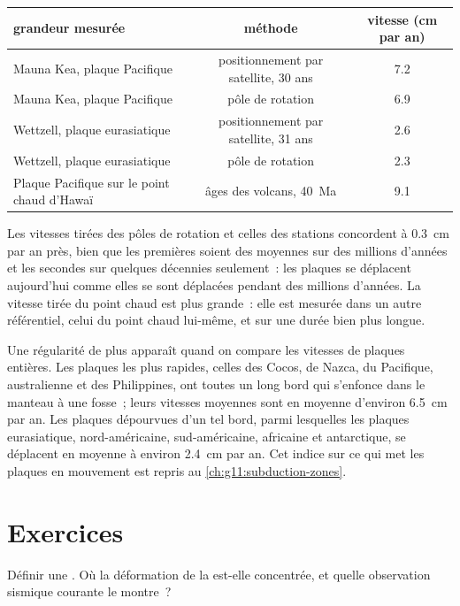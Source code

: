 \begin{center}
\small
\begin{tabular}{|l|c|c|}
\hline
grandeur mesurée & méthode & vitesse (\unit{cm} par an) \\ \hline
Mauna Kea, plaque Pacifique & positionnement par satellite, 30 ans & 7.2 \\
Mauna Kea, plaque Pacifique & pôle de rotation & 6.9 \\
Wettzell, plaque eurasiatique & positionnement par satellite, 31 ans & 2.6 \\
Wettzell, plaque eurasiatique & pôle de rotation & 2.3 \\
Plaque Pacifique sur le point chaud d'Hawaï & âges des volcans, 40~Ma & 9.1 \\ \hline
\end{tabular}
\end{center}

Les vitesses tirées des pôles de rotation et celles des stations concordent
à \qty{0.3}{cm} par an près, bien que les premières soient des moyennes sur
des millions d'années et les secondes sur quelques décennies seulement~: les
plaques se déplacent aujourd'hui comme elles se sont déplacées pendant des
millions d'années. La vitesse tirée du point chaud est plus grande~: elle
est mesurée dans un autre référentiel, celui du point chaud lui-même, et sur
une durée bien plus longue.

Une régularité de plus apparaît quand on compare les vitesses de plaques
entières. Les plaques les plus rapides, celles des Cocos, de Nazca, du
Pacifique, australienne et des Philippines, ont toutes un long bord qui
s'enfonce dans le manteau à une fosse~; leurs vitesses moyennes sont en
moyenne d'environ \qty{6.5}{cm} par an. Les plaques dépourvues d'un tel
bord, parmi lesquelles les plaques eurasiatique, nord-américaine,
sud-américaine, africaine et antarctique, se déplacent en moyenne à environ
\qty{2.4}{cm} par an. Cet indice sur ce qui met les plaques en mouvement est
repris au \cref{ch:g11:subduction-zones}.

\section{Exercices}

\begin{exercise}[$\star$]\label{exo:g11:plate-motions:1}
Définir une . Où la déformation de la  est-elle
concentrée, et quelle observation sismique courante le montre~?
\end{exercise}

